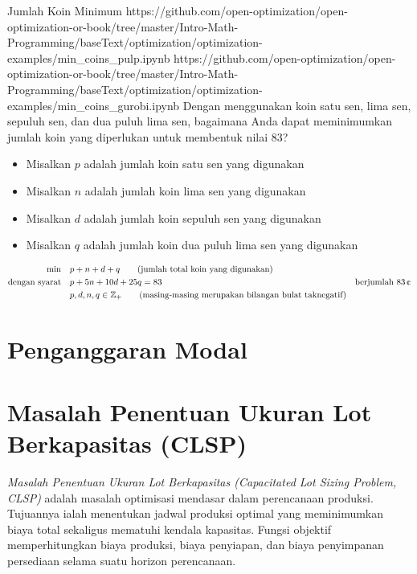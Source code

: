 \begin{examplewithallcode}{Jumlah Koin Minimum}
{}
{https://github.com/open-optimization/open-optimization-or-book/tree/master/Intro-Math-Programming/baseText/optimization/optimization-examples/min_coins_pulp.ipynb}
{https://github.com/open-optimization/open-optimization-or-book/tree/master/Intro-Math-Programming/baseText/optimization/optimization-examples/min_coins_gurobi.ipynb}
\label{ex:min-coins}
Dengan menggunakan koin satu sen, lima sen, sepuluh sen, dan dua puluh lima sen, bagaimana Anda dapat meminimumkan jumlah koin yang diperlukan untuk membentuk nilai 83\textcent{}?

\begin{itemize}
\item Misalkan $p$ adalah jumlah koin satu sen yang digunakan
\item Misalkan $n$ adalah jumlah koin lima sen yang digunakan
\item Misalkan $d$ adalah jumlah koin sepuluh sen yang digunakan
\item Misalkan $q$ adalah jumlah koin dua puluh lima sen yang digunakan
\end{itemize}
\begin{align*}
\min \quad & p + n + d + q   \tag{jumlah total koin yang digunakan} \\
\st        & p + 5n + 10d + 25 q = 83 & \text{berjumlah } 83\,\text{\textcent} \\
& p,d,n,q \in \Z_+   \tag{masing-masing merupakan bilangan bulat taknegatif}
\end{align*}
\end{examplewithallcode}

\section{Penganggaran Modal}
\label{sec:capital-budgeting}



\section{Masalah Penentuan Ukuran Lot Berkapasitas (CLSP)}

\textit{Masalah Penentuan Ukuran Lot Berkapasitas (Capacitated Lot Sizing Problem, CLSP)} adalah masalah optimisasi mendasar dalam perencanaan produksi. Tujuannya ialah menentukan jadwal produksi optimal yang meminimumkan biaya total sekaligus mematuhi kendala kapasitas. Fungsi objektif memperhitungkan biaya produksi, biaya penyiapan, dan biaya penyimpanan persediaan selama suatu horizon perencanaan.

